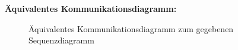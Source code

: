 \documentclass{swp1}
\begin{document}
\textbf{Äquivalentes Kommunikationsdiagramm:}
\begin{figure}[h]
\caption{Äquivalentes Kommunikationsdiagramm zum gegebenen Sequenzdiagramm}
\label{ab2}
\end{figure}
\end{document}
